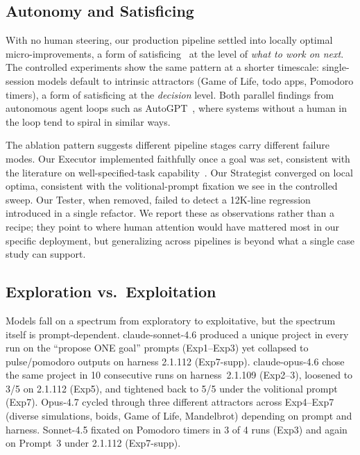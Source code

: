\documentclass{article}
\begin{document}
\subsection{Autonomy and Satisficing}

With no human steering, our production pipeline settled into
locally optimal micro-improvements, a form of
satisficing~\citep{simon1956} at the level of \emph{what to
work on next}. The controlled experiments show the same
pattern at a shorter timescale: single-session models default
to intrinsic attractors (Game of Life, todo apps, Pomodoro
timers), a form of satisficing at the \emph{decision} level.
Both parallel findings from autonomous agent loops such as
AutoGPT~\citep{significantgravitas2023autogpt}, where systems
without a human in the loop tend to spiral in similar ways.

The ablation pattern suggests different pipeline stages carry
different failure modes. Our Executor implemented faithfully
once a goal was set, consistent with the literature on
well-specified-task capability~\citep{swebenchpro2026}. Our
Strategist converged on local optima, consistent with the
volitional-prompt fixation we see in the controlled sweep.
Our Tester, when removed, failed to detect a 12K-line
regression introduced in a single refactor. We report these
as observations rather than a recipe; they point to where
human attention would have mattered most in our specific
deployment, but generalizing across pipelines is beyond what
a single case study can support.

\subsection{Exploration vs.\ Exploitation}

Models fall on a spectrum from exploratory to exploitative, but
the spectrum itself is prompt-dependent. claude-sonnet-4.6
produced a unique project in every run on the ``propose ONE
goal'' prompts (Exp1--Exp3) yet collapsed to pulse/pomodoro
outputs on harness 2.1.112 (Exp7-supp). claude-opus-4.6 chose
the same project in 10 consecutive runs on harness~2.1.109
(Exp2--3), loosened to 3/5 on 2.1.112 (Exp5), and tightened
back to 5/5 under the volitional prompt (Exp7). Opus-4.7
cycled through three different attractors across Exp4--Exp7
(diverse simulations, boids, Game of Life, Mandelbrot) depending
on prompt and harness. Sonnet-4.5 fixated on Pomodoro timers in
3 of 4 runs (Exp3) and again on Prompt~3 under 2.1.112 (Exp7-supp).
\end{document}
